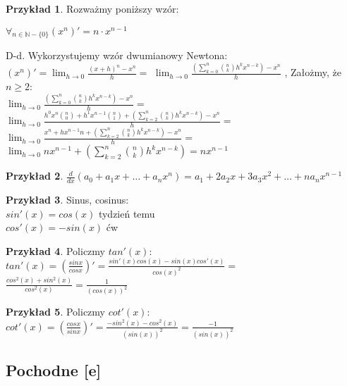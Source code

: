 \documentclass{article}
\theoremstyle{definition}
\theoremstyle{definition}
\theoremstyle{definition}
\newtheorem{pk}{Przykład}[subsection]
\theoremstyle{definition}
\begin{document}
\begin{pk}
    Rozważmy poniższy wzór:
    \begin{center}
        $\forall_{n\in\mathbb{N}-\{0\}} (x^n)' = n\cdot x^{n-1}$
    \end{center}
    D-d. Wykorzystujemy wzór dwumianowy Newtona:\\
    $(x^n)'=\lim_{h\rightarrow 0} \frac{(x+h)^n-x^n}{h}=$
    $\lim_{h\rightarrow 0} \frac{\left(\sum_{k=0}^{n} \binom{n}{k} h^k x^{n-k}\right) - x^{n}}{h}$
    , Założmy, że $n\geq 2$:\\
    $\lim_{h\rightarrow 0} \frac{\left(\sum_{k=0}^{n} \binom{n}{k} h^k x^{n-k}\right) - x^{n}}{h}=$
    $\lim_{h\rightarrow 0} \frac{h^0 x^n \binom{n}{0}+h^1 x^{n-1} \binom{n}{1} + \left(\sum_{k=2}^{n} \binom{n}{k} h^k x^{n-k}\right) - x^n}{h}=$\\
    $\lim_{h\rightarrow 0} \frac{x^n + h x^{n-1} n + \left(\sum_{k=2}^{n} \binom{n}{k} h^k x^{n-k}\right) - x^n}{h}=$
    $\lim_{h\rightarrow 0} n x^{n-1} + \left(\sum_{k=2}^{n} \binom{n}{k} h^k x^{n-k}\right) = n x^{n-1}$
\end{pk}

\begin{pk}
    $\frac{d}{dx} \left(a_0 + a_1 x + \dots + a_n x^n\right)=a_1 + 2a_2 x + 3a_3 x^2 + \dots + n a_n x^{n-1}$
\end{pk}

\begin{pk}
    Sinus, cosinus:\\
    $sin'(x)=cos(x)$ tydzień temu\\
    $cos'(x)=-sin(x)$ ćw\\
\end{pk}

\begin{pk}
    Policzmy $tan'(x)$:\\
    $tan'(x)=(\frac{sinx}{cosx})'=\frac{sin'(x)cos(x)-sin(x)cos'(x)}{cos(x)^2}=$
    $\frac{cos^2(x)+sin^2(x)}{cos^2(x)}=\frac{1}{(cos(x))^2}$
\end{pk}

\begin{pk}
    Policzmy $cot'(x)$:\\
    $cot'(x)=(\frac{cosx}{sinx})'=\frac{-sin^2(x)-cos^2(x)}{\left(sin(x)\right)^2}=\frac{-1}{\left(sin(x)\right)^2}$
\end{pk}

\subsection{Pochodne [e]}
\end{document}
